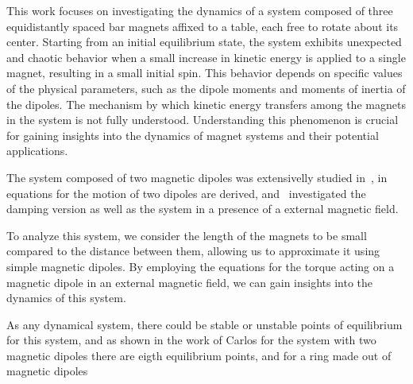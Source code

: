 This work focuses on investigating the dynamics of a system composed of three equidistantly spaced bar magnets affixed to a table, each free to rotate about its center. Starting from an initial equilibrium state, the system exhibits unexpected and chaotic behavior when a small increase in kinetic energy is applied to a single magnet, resulting in a small initial spin. This behavior depends on specific values of the physical parameters, such as the dipole moments and moments of inertia of the dipoles. The mechanism by which kinetic energy transfers among the magnets in the system is not fully understood. Understanding this phenomenon is crucial for gaining insights into the dynamics of magnet systems and their potential applications. 

The system composed of two magnetic dipoles was extensivelly studied in~\cite{yung1970analytic, ku2016interaction, santos2019dinamica}, in~\cite{yung1970analytic} equations for the motion of two dipoles are derived, and~\cite{ku2016interaction, santos2019dinamica} investigated the damping version as well as the system in a presence of a external magnetic field. 

To analyze this system, we consider the length of the magnets to be small compared to the distance between them, allowing us to approximate it using simple magnetic dipoles. By employing the equations for the torque acting on a magnetic dipole in an external magnetic field, we can gain insights into the dynamics of this system.

As any dynamical system, there could be stable or unstable points of equilibrium for this system, and as shown in the work of Carlos for the system with two magnetic dipoles there are eigth equilibrium points, and for a ring made out of magnetic dipoles 
